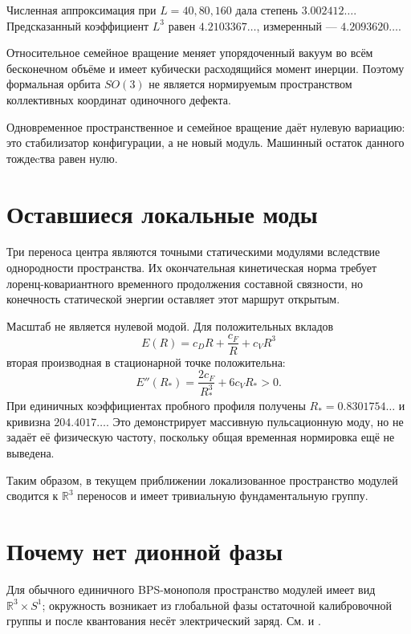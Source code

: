Численная аппроксимация при $L=40,80,160$ дала степень
$3.002412\ldots$. Предсказанный коэффициент $L^3$ равен
$4.2103367\ldots$, измеренный --- $4.2093620\ldots$.

\begin{theorem}
Относительное семейное вращение меняет упорядоченный вакуум во всём бесконечном
объёме и имеет кубически расходящийся момент инерции. Поэтому формальная
орбита $SO(3)$ не является нормируемым пространством коллективных
координат одиночного дефекта.
\end{theorem}

Одновременное пространственное и семейное вращение даёт нулевую вариацию:
это стабилизатор конфигурации, а не новый модуль. Машинный остаток данного
тождеcтва равен нулю.

\section{Оставшиеся локальные моды}

Три переноса центра являются точными статическими модулями вследствие
однородности пространства. Их окончательная кинетическая норма требует
лоренц-ковариантного временного продолжения составной связности, но
конечность статической энергии оставляет этот маршрут открытым.

Масштаб не является нулевой модой. Для положительных вкладов
\begin{equation}
 E(R)=c_D R+\frac{c_F}{R}+c_VR^3
\end{equation}
вторая производная в стационарной точке положительна:
\begin{equation}
 E''(R_*)=\frac{2c_F}{R_*^3}+6c_VR_*>0.
\end{equation}
При единичных коэффициентах пробного профиля получены
$R_*=0.8301754\ldots$ и кривизна $204.4017\ldots$. Это демонстрирует
массивную пульсационную моду, но не задаёт её физическую частоту, поскольку
общая временная нормировка ещё не выведена.

Таким образом, в текущем приближении локализованное пространство модулей
сводится к $\mathbb R^3$ переносов и имеет тривиальную фундаментальную
группу.

\section{Почему нет дионной фазы}

Для обычного единичного BPS-монополя пространство модулей имеет вид
$\mathbb R^3\times S^1$; окружность возникает из глобальной фазы
остаточной калибровочной группы и после квантования несёт электрический заряд.
См.  и
.

